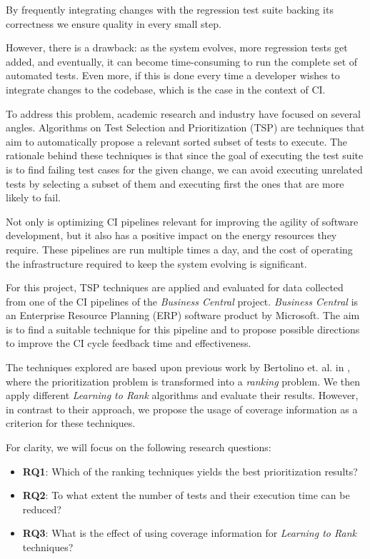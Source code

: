 By frequently integrating changes with the regression test suite backing its correctness
we ensure quality in every small step.

However, there is a drawback: as the system evolves, more regression tests
get added, and eventually, it can become time-consuming to run the complete
set of automated tests. Even more, if this is done every time a developer wishes to
integrate changes to the codebase, which is the case in the context of CI.

To address this problem, academic research and industry have focused on several angles.
Algorithms on Test Selection and Prioritization (TSP) are techniques that aim to 
automatically propose a relevant sorted subset of tests to execute. The rationale
behind these techniques is that since the goal of executing the test suite is to
find failing test cases for the given change, we can avoid executing unrelated tests
by selecting a subset of them and executing first the ones that are more likely to fail.

Not only is optimizing CI pipelines relevant for improving the agility of software development, 
but it also has a positive impact on the energy resources they require.
These pipelines are run multiple times a day, and the cost of operating the infrastructure
required to keep the system evolving is significant.

For this project, TSP techniques are applied and evaluated for data collected from one of the CI pipelines
of the \emph{Business Central} project. \emph{Business Central} is an Enterprise Resource Planning (ERP)
software product by Microsoft.  The aim is to find a suitable technique for this pipeline and to 
propose possible directions to improve the CI cycle feedback time and effectiveness.

The techniques explored are based upon previous work by Bertolino
et. al. in \cite{Bertolino2020LearningtoRankVR}, where the prioritization problem is transformed
into a \emph{ranking} problem. We then apply different \emph{Learning to Rank} algorithms and evaluate
their results. However, in contrast to their approach, we propose the usage of coverage information 
as a criterion for these techniques.

For clarity, we will focus on the following research questions:
\begin{itemize}
    \item \textbf{RQ1}: Which of the ranking techniques yields the best prioritization results?
    \item \textbf{RQ2}: To what extent the number of tests and their execution time can be reduced?
    \item \textbf{RQ3}: What is the effect of using coverage information for \emph{Learning to Rank} techniques?
\end{itemize}

